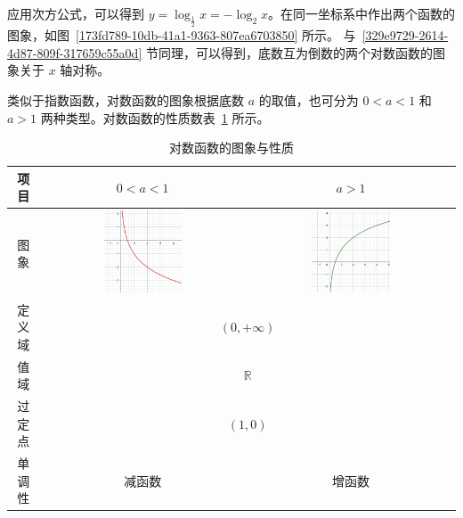 \documentclass[a4paper,openany]{ctexbook}
\begin{document}
应用次方公式，可以得到 \(y=\log_{\frac{1}{2}} x=-\log_2 x\)。在同一坐标系中作出两个函数的图象，如图~\ref{173fd789-10db-41a1-9363-807ea6703850} 所示。
与~\ref{329e9729-2614-4d87-809f-317659c55a0d} 节同理，可以得到，底数互为倒数的两个对数函数的图象关于 \(x\) 轴对称。

类似于指数函数，对数函数的图象根据底数 \(a\) 的取值，也可分为 \(0<a<1\) 和 \(a>1\) 两种类型。对数函数的性质数表~\ref{tbl:dvuuhjuudetuxlyuxkvi} 所示。

\begin{table}
    \begin{tabular}{|c|c|c|} \hline
        项目   & \(0<a<1\)                                          & \(a>1\)                                            \\ \hline
        图象   & \includegraphics[width=0.4\textwidth]{image32.png} & \includegraphics[width=0.4\textwidth]{image30.png} \\ \hline
        定义域 & \multicolumn{2}{c|}{\((0,+\infty )\)}                                                                   \\ \hline
        值域   & \multicolumn{2}{c|}{\(\mathbb{R} \)}                                                                    \\ \hline
        过定点 & \multicolumn{2}{c|}{\((1,0)\)}                                                                          \\ \hline
        单调性 & 减函数                                             & 增函数                                             \\ \hline
    \end{tabular}
    \caption{对数函数的图象与性质} \label{tbl:dvuuhjuudetuxlyuxkvi}
\end{table}
\end{document}
